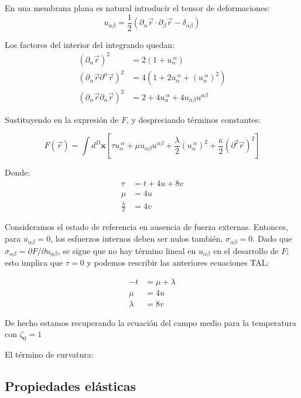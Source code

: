 En una membrana plana es natural introducir el tensor de deformaciones:
\begin{equation}
u_{\alpha\beta}=\frac{1}{2}(\partial_{\alpha}\vec{r}\cdot\partial_{\beta}\vec{r}-\delta_{\alpha\beta})
\end{equation}

Los factores del interior del integrando quedan:
\begin{align}
(\partial_{\alpha}\vec{r})^2&=2(1+u_{\alpha}^{\ \alpha})\\
(\partial_{\alpha}\vec{r}\partial^{\alpha}\vec{r})^2&=4(1+2u_{\alpha}^{\
  \alpha}+(u_{\alpha}^{\ \alpha})^2)\\
(\partial_{\alpha}\vec{r}\partial_{\alpha}\vec{r})^2&=2+4u_{\alpha}^{\
  \alpha}+4u_{\alpha\beta}u^{\alpha\beta}
\end{align}

Sustituyendo en la expresión de $F$, y despreciando términos constantes:

\begin{equation}
F(\vec{r})=\int d^D\mathbf{x}
\left[\tau u_{\alpha}^{\ \alpha}+
\mu u_{\alpha\beta}u^{\alpha\beta} +
\frac{\lambda}{2}(u_{\alpha}^{\ \alpha})^2 +
\frac{\kappa}{2}(\partial^2\vec{r})^2\right]
\end{equation}

Donde:
\begin{align}
\tau&=t+4u+8v\\
\mu&=4u\\
\frac{\lambda}{2}&=4v
\end{align}

Consideramos el estado de referencia en ausencia de fuerza externas. Entonces,
para $u_{\alpha\beta}=0$, los esfuerzos internos deben ser nulos también,
$\sigma_{\alpha\beta}=0$. Dado que $\sigma_{\alpha\beta}=\partial F / \partial
u_{\alpha\beta}$, se sigue que no hay término lineal en $u_{\alpha\beta}$ en
el desarrollo de $F$; esto implica que $\tau=0$ y podemos rescribir las
anteriores ecuaciones TAL:

\begin{align}
-t&=\mu+\lambda\\
\mu&=4u\\
\lambda&=8v
\end{align}   

De hecho estamos recuperando la ecuación del campo medio para la temperatura
con $\zeta_0=1$

El término de curvatura:

\subsection{Propiedades elásticas}
